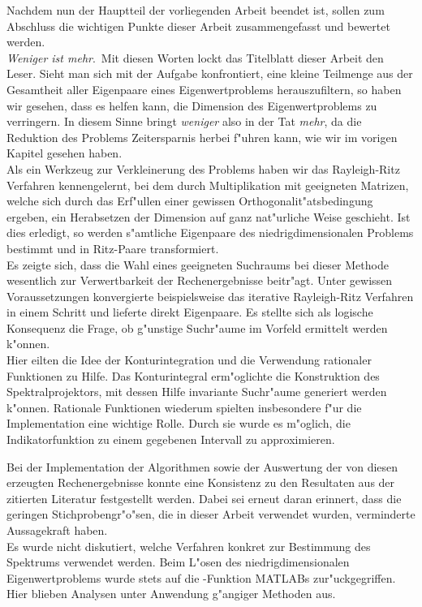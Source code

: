 Nachdem nun der Hauptteil der vorliegenden Arbeit beendet ist, sollen zum Abschluss die wichtigen Punkte dieser Arbeit zusammengefasst und bewertet werden.\\

\glqq \emph{Weniger ist mehr}.\grqq\ Mit diesen Worten lockt das Titelblatt dieser Arbeit den Leser. Sieht man sich mit der Aufgabe konfrontiert, eine kleine Teilmenge aus der Gesamtheit aller Eigenpaare eines Eigenwertproblems herauszufiltern, so haben wir gesehen, dass es helfen kann, die Dimension des Eigenwertproblems zu verringern. In diesem Sinne bringt \emph{weniger} also in der Tat \emph{mehr}, da die Reduktion des Problems Zeitersparnis herbei f"uhren kann, wie wir im vorigen Kapitel gesehen haben.\\

Als ein Werkzeug zur Verkleinerung des Problems haben wir das Rayleigh-Ritz Verfahren kennengelernt, bei dem durch Multiplikation mit geeigneten Matrizen, welche sich durch das Erf"ullen einer gewissen Orthogonalit"atsbedingung ergeben, ein Herabsetzen der Dimension auf ganz nat"urliche Weise geschieht. Ist dies erledigt, so werden s"amtliche Eigenpaare des niedrigdimensionalen Problems bestimmt und in Ritz-Paare transformiert.\\

Es zeigte sich, dass die Wahl eines geeigneten Suchraums bei dieser Methode wesentlich zur Verwertbarkeit der Rechenergebnisse beitr"agt. Unter gewissen Voraussetzungen konvergierte beispielsweise das iterative Rayleigh-Ritz Verfahren in einem Schritt und lieferte direkt Eigenpaare. Es stellte sich als logische Konsequenz die Frage, ob g"unstige Suchr"aume im Vorfeld ermittelt werden k"onnen.\\

Hier eilten die Idee der Konturintegration und die Verwendung rationaler Funktionen zu Hilfe. Das Konturintegral erm"oglichte die Konstruktion des Spektralprojektors, mit dessen Hilfe invariante Suchr"aume generiert werden k"onnen. Rationale Funktionen wiederum spielten insbesondere f"ur die Implementation eine wichtige Rolle. Durch sie wurde es m"oglich, die Indikatorfunktion zu einem gegebenen Intervall zu approximieren.
\newpage

Bei der Implementation der Algorithmen sowie der Auswertung der von diesen erzeugten Rechenergebnisse konnte eine Konsistenz zu den Resultaten aus der zitierten Literatur festgestellt werden. Dabei sei erneut daran erinnert, dass die geringen Stichprobengr"o"sen, die in dieser Arbeit verwendet wurden, verminderte Aussagekraft haben.\\

Es wurde nicht diskutiert, welche Verfahren konkret zur Bestimmung des Spektrums verwendet werden. Beim L"osen des niedrigdimensionalen Eigenwertproblems wurde stets auf die -Funktion MATLABs zur"uckgegriffen. Hier blieben Analysen unter Anwendung g"angiger Methoden aus.\\
